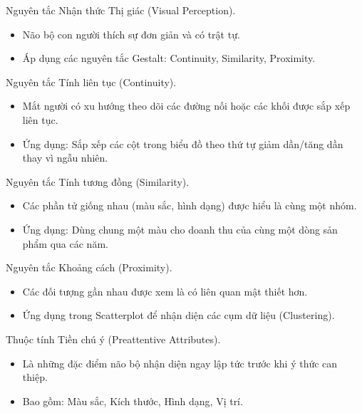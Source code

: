 \documentclass[aspectratio=169]{beamer}
\begin{document}
\begin{frame}{Nguyên tắc Nhận thức Thị giác (Visual Perception).}
    \begin{itemize}
        \item Não bộ con người thích sự đơn giản và có trật tự.
        \item Áp dụng các nguyên tắc Gestalt: Continuity, Similarity, Proximity.
    \end{itemize}
\end{frame}


\begin{frame}{Nguyên tắc Tính liên tục (Continuity).}
    \begin{itemize}
        \item Mắt người có xu hướng theo dõi các đường nối hoặc các khối được sắp xếp liên tục.
        \item Ứng dụng: Sắp xếp các cột trong biểu đồ theo thứ tự giảm dần/tăng dần thay vì ngẫu nhiên.
    \end{itemize}
\end{frame}


\begin{frame}{Nguyên tắc Tính tương đồng (Similarity).}
    \begin{itemize}
        \item Các phần tử giống nhau (màu sắc, hình dạng) được hiểu là cùng một nhóm.
        \item Ứng dụng: Dùng chung một màu cho doanh thu của cùng một dòng sản phẩm qua các năm.
    \end{itemize}
\end{frame}


\begin{frame}{Nguyên tắc Khoảng cách (Proximity).}
    \begin{itemize}
        \item Các đối tượng gần nhau được xem là có liên quan mật thiết hơn.
        \item Ứng dụng trong Scatterplot để nhận diện các cụm dữ liệu (Clustering).
    \end{itemize}
\end{frame}


\begin{frame}{Thuộc tính Tiền chú ý (Preattentive Attributes).}
    \begin{itemize}
        \item Là những đặc điểm não bộ nhận diện ngay lập tức trước khi ý thức can thiệp.
        \item Bao gồm: Màu sắc, Kích thước, Hình dạng, Vị trí.
    \end{itemize}
\end{frame}
\end{document}
